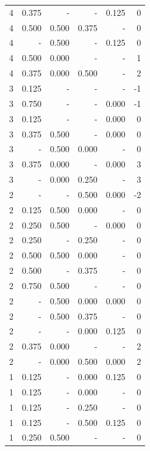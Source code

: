 \documentclass[a4paper]{article}\usepackage{graphicx, color}
\begin{document}
\begin{table}[ht]
\begin{tabular}{rrrrrr}
   \rowcolor{nullColor} 4 & 0.375 & - & - & 0.125 & 0 \\ 
  4 & 0.500 & 0.500 & 0.375 & - & 0 \\ 
  4 & - & 0.500 & - & 0.125 & 0 \\ 
  4 & 0.500 & 0.000 & - & - & 1 \\ 
   \rowcolor{badColor} 4 & 0.375 & 0.000 & 0.500 & - & 2 \\ 
   \rowcolor{nullColor} 3 & 0.125 & - & - & - & -1 \\ 
   \rowcolor{nullColor} 3 & 0.750 & - & - & 0.000 & -1 \\ 
   \rowcolor{nullColor} 3 & 0.125 & - & - & 0.000 & 0 \\ 
  3 & 0.375 & 0.500 & - & 0.000 & 0 \\ 
   \rowcolor{badColor} 3 & - & 0.500 & 0.000 & - & 0 \\ 
  3 & 0.375 & 0.000 & - & 0.000 & 3 \\ 
   \rowcolor{badColor} 3 & - & 0.000 & 0.250 & - & 3 \\ 
   \rowcolor{sosoColor} 2 & - & - & 0.500 & 0.000 & -2 \\ 
   \rowcolor{badColor} 2 & 0.125 & 0.500 & 0.000 & - & 0 \\ 
  2 & 0.250 & 0.500 & - & 0.000 & 0 \\ 
   \rowcolor{sosoColor} 2 & 0.250 & - & 0.250 & - & 0 \\ 
   \rowcolor{badColor} 2 & 0.500 & 0.500 & 0.000 & - & 0 \\ 
   \rowcolor{sosoColor} 2 & 0.500 & - & 0.375 & - & 0 \\ 
  2 & 0.750 & 0.500 & - & - & 0 \\ 
   \rowcolor{badColor} 2 & - & 0.500 & 0.000 & 0.000 & 0 \\ 
  2 & - & 0.500 & 0.375 & - & 0 \\ 
   \rowcolor{sosoColor} 2 & - & - & 0.000 & 0.125 & 0 \\ 
  2 & 0.375 & 0.000 & - & - & 2 \\ 
   \rowcolor{badColor} 2 & - & 0.000 & 0.500 & 0.000 & 2 \\ 
   \rowcolor{sosoColor} 1 & 0.125 & - & 0.000 & 0.125 & 0 \\ 
   \rowcolor{sosoColor} 1 & 0.125 & - & 0.000 & - & 0 \\ 
   \rowcolor{sosoColor} 1 & 0.125 & - & 0.250 & - & 0 \\ 
   \rowcolor{sosoColor} 1 & 0.125 & - & 0.500 & 0.125 & 0 \\ 
  1 & 0.250 & 0.500 & - & - & 0 \\ 

\end{tabular}
\end{table}
\end{document}
